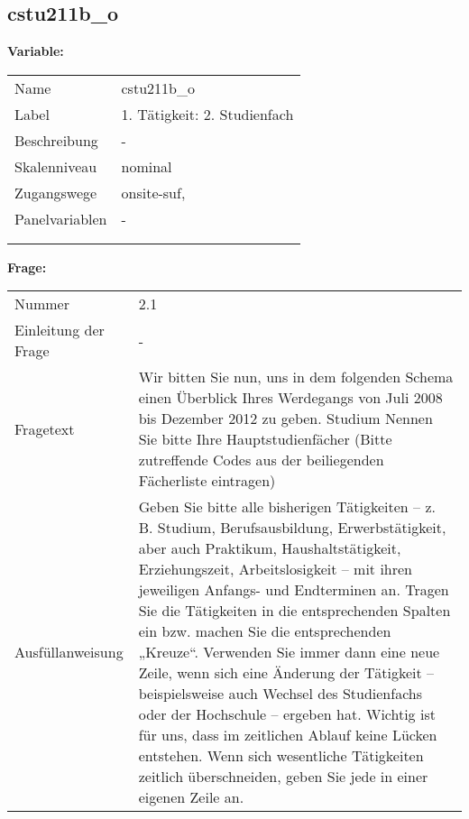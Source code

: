	
	
	\subsection{cstu211b\_o}
	\label{subSection:cstu211b_o}

	\noindent\textbf{Variable:}\\
		\begin{tabular}{lL{11.3cm}}
			\label{tableVariable:cstu211b_o}
			Name & cstu211b\_o \\
			Label & 1. Tätigkeit: 2. Studienfach \\
			Beschreibung & - \\
			Skalenniveau & nominal \\
			Zugangswege &
				onsite-suf,
 \\
			Panelvariablen & -
			 \\
			 \\
 \\
		\end{tabular}

		\vspace*{1 cm}
		\noindent\textbf{Frage:}\\
		\begin{tabular}{lL{11.3cm}}
			\label{tableQuestion:cstu211b_o}
			Nummer & 2.1 \\
			Einleitung der Frage & - \\
			Fragetext & Wir bitten Sie nun, uns in dem folgenden Schema einen Überblick Ihres Werdegangs von Juli 2008 bis Dezember 2012 zu geben.
Studium
Nennen Sie bitte Ihre Hauptstudienfächer
(Bitte zutreffende Codes aus der beiliegenden Fächerliste eintragen) \\
			Ausfüllanweisung & Geben Sie bitte alle bisherigen Tätigkeiten – z. B. Studium, Berufsausbildung, Erwerbstätigkeit, aber auch Praktikum, Haushaltstätigkeit,
Erziehungszeit, Arbeitslosigkeit – mit ihren jeweiligen Anfangs- und Endterminen an. Tragen Sie die Tätigkeiten in die entsprechenden Spalten ein bzw. machen Sie die entsprechenden „Kreuze“. Verwenden Sie immer dann eine neue Zeile, wenn sich eine Änderung der Tätigkeit – beispielsweise auch Wechsel des Studienfachs oder der Hochschule – ergeben hat. Wichtig ist für uns, dass im zeitlichen Ablauf keine Lücken entstehen. Wenn sich wesentliche Tätigkeiten zeitlich überschneiden, geben Sie jede in einer eigenen Zeile an. \\
		\end{tabular}





